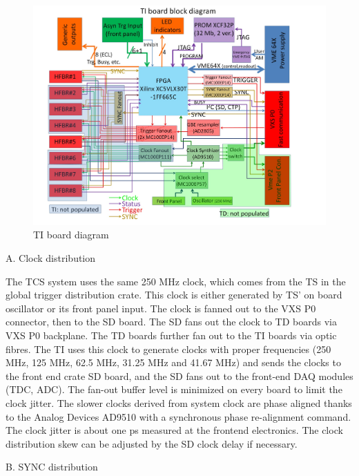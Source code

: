 \begin{figure}[hbt]
	\centering
	\includegraphics[width=1.0\columnwidth,keepaspectratio]{img/TIdiagram.jpg}
	\caption{TI board diagram}
	\label{fig:TIdiagram}
\end{figure}


A.	Clock distribution

The TCS system uses the same 250 MHz clock, which comes from the TS in the global trigger distribution crate.  This clock is either generated by TS’ on board oscillator or its front panel input.  The clock is fanned out to the VXS P0 connector, then to the SD board.  The SD fans out the clock to TD boards via VXS P0 backplane.  The TD boards further fan out to the TI boards via optic fibres.  The TI uses this clock to generate clocks with proper frequencies (250 MHz, 125 MHz, 62.5 MHz, 31.25 MHz and 41.67 MHz) and sends the clocks to the front end crate SD board, and the SD fans out to the front-end DAQ modules (TDC, ADC).  The fan-out buffer level is minimized on every board to limit the clock jitter.  The slower clocks derived from system clock are phase aligned thanks to the Analog Devices AD9510 with a synchronous phase re-alignment command.  The clock jitter is about one ps measured at the frontend electronics.  The clock distribution skew can be adjusted by the SD clock delay if necessary.

B.	SYNC distribution

